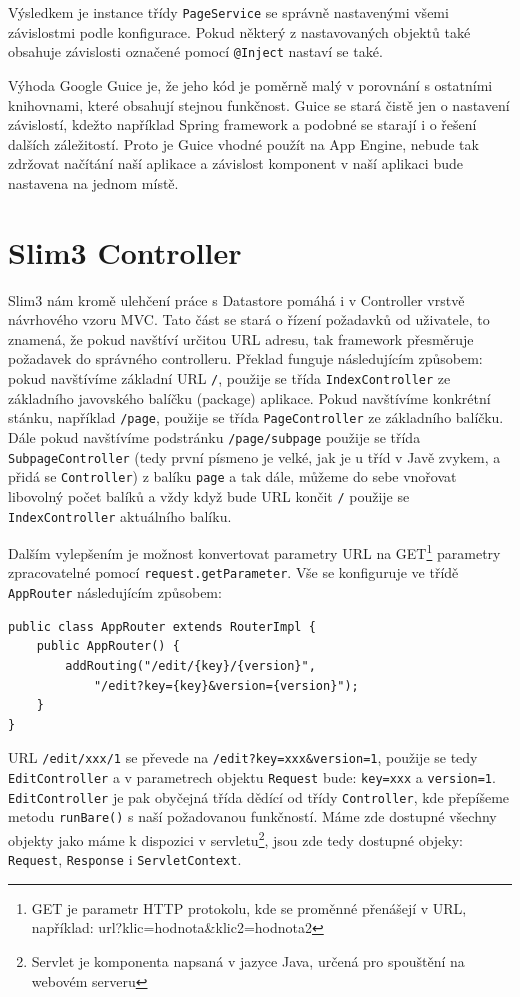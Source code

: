 Výsledkem je instance třídy \verb|PageService| se správně nastavenými všemi závislostmi podle konfigurace. Pokud některý z nastavovaných objektů  také obsahuje závislosti označené pomocí \verb|@Inject| nastaví se také.

Výhoda Google Guice je, že jeho kód je poměrně malý v porovnání s ostatními knihovnami, které obsahují stejnou funkčnost. Guice se stará čistě jen o nastavení závislostí, kdežto například Spring framework a podobné se starají i o řešení dalších záležitostí. Proto je Guice vhodné použít na App Engine, nebude tak zdržovat načítání naší aplikace a závislost komponent v naší aplikaci bude nastavena na jednom místě.

\section{Slim3 Controller}
Slim3 nám kromě ulehčení práce s Datastore pomáhá i v Controller vrstvě návrhového vzoru MVC. Tato část se stará o řízení požadavků od uživatele, to znamená, že pokud navštíví určitou URL adresu, tak framework přesměruje požadavek do správného controlleru. Překlad funguje následujícím způsobem: pokud navštívíme základní URL \verb|/|, použije se třída \verb|IndexController| ze základního javovského balíčku (package) aplikace. Pokud navštívíme konkrétní stánku, například \verb|/page|, použije se třída \verb|PageController| ze základního balíčku. Dále pokud navštívíme podstránku \verb|/page/subpage| použije se třída \verb|SubpageController|  (tedy první písmeno je velké, jak je u tříd v Javě zvykem, a přidá se \verb|Controller|) z balíku \verb|page| a tak dále, můžeme do sebe vnořovat libovolný počet balíků a vždy když bude URL končit \verb|/| použije se \verb|IndexController| aktuálního balíku. 

Dalším vylepšením je možnost konvertovat parametry URL na GET\footnote{GET je parametr HTTP protokolu, kde se proměnné přenášejí v URL, například: url?klic=hodnota\&klic2=hodnota2} parametry zpracovatelné pomocí \verb|request.getParameter|. Vše se konfiguruje ve třídě \verb|AppRouter| následujícím způsobem:

\begin{lstlisting}[caption={Konfigurace nastaveníURL},label=lst:urlConfiguration,belowcaptionskip=0.4cm]
public class AppRouter extends RouterImpl {
	public AppRouter() {
		addRouting("/edit/{key}/{version}", 
			"/edit?key={key}&version={version}");
	}
}
\end{lstlisting}

URL \verb|/edit/xxx/1| se převede na \verb|/edit?key=xxx&version=1|, použije se tedy \verb|EditController| a v parametrech objektu \verb|Request| bude: \verb|key=xxx| a \verb|version=1|. \verb|EditController| je pak obyčejná třída dědící od třídy \verb|Controller|, kde přepíšeme metodu \verb|runBare()| s naší požadovanou funkčností. Máme zde dostupné všechny objekty jako máme k dispozici v servletu\footnote{Servlet je komponenta napsaná v jazyce Java, určená pro spouštění na webovém serveru}, jsou zde tedy dostupné objeky: \verb|Request|, \verb|Response| i \verb|ServletContext|.


